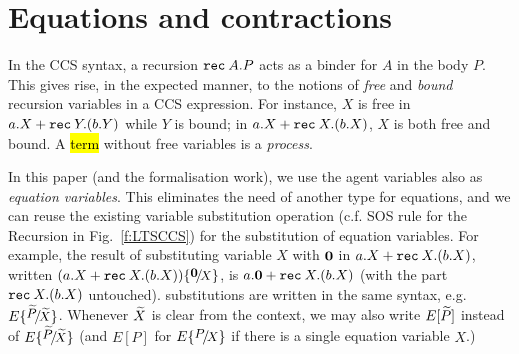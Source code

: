 \section{Equations and contractions}
\label{s:eq}

In the CCS syntax, 
a recursion ${\tt rec}\: A . P$ acts as a binder for $A$ in the body $P$. 
This gives rise, in the expected manner, to the notions of 
\emph{free} and \emph{bound} recursion variables in a CCS expression. 
For instance,  $X$ is free in $a.X + {\tt rec}\: Y . (b.Y)$ while $Y$
is bound; in $a.X + {\tt rec}\: X . (b.X)$, $X$ is both free and bound.
A \hl{term} without free variables is a \emph{process}.

In this paper (and the formalisation work), we use the agent
variables also as \emph{equation variables}. This eliminates the need of
another type for  equations, and we can reuse the existing
variable substitution operation (c.f. SOS rule for the Recursion in
Fig.~\ref{f:LTSCCS}) for the substitution of equation variables.
For example, the result of substituting variable $X$ with ${\boldsymbol 0}$ in $a.X +
{\tt rec}\: X . (b.X)$,  written $(a.X + \recu X (b.X)) \sub {\nil} X$, is
$a.{\boldsymbol 0} + {\tt rec}\: X . (b.X)$ (with the part ${\tt rec}\: X . (b.X)$
untouched). \Multivariate substitutions are written in the same syntax,
e.g. $E \sub {\til P} {\til X}$. Whenever $\widetilde X$ is clear from the
context, we may also write $E[\widetilde P]$ instead of $E \sub {\til P} {\til
  X}$ (and $E[P]$ for $E \sub P X$ if there is a single equation variable $X$.)

 
